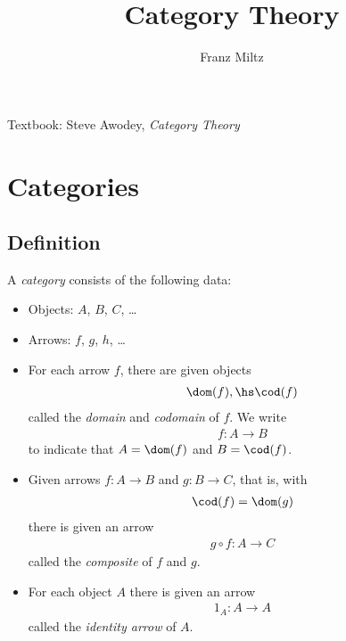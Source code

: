 \documentclass{article}
\begin{document}
\mkawodeythms
\title{Category Theory}
\author{Franz Miltz}
\maketitle
\noindent Textbook: Steve Awodey, \emph{Category Theory}
\tableofcontents
\pagebreak

\section{Categories}

\subsection{Definition}

\begin{definition}
    A \emph{category} consists of the following data:
    \begin{itemize}
        \item Objects: $A$, $B$, $C$, \dots
        \item Arrows: $f$, $g$, $h$, \dots
        \item For each arrow $f$, there are given objects \begin{align*}
                  \dom(f),\hs \cod(f)
              \end{align*}
              called the \emph{domain} and \emph{codomain} of $f$. We write
              \begin{align*}
                  f:A\to B
              \end{align*}
              to indicate that $A=\dom(f)$ and $B=\cod(f)$.
        \item Given arrows $f:A\to B$ and $g:B\to C$, that is, with \begin{align*}
                  \cod(f) = \dom(g)
              \end{align*}
              there is given an arrow
              \begin{align*}
                  g\circ f: A\to C
              \end{align*}
              called the \emph{composite} of $f$ and $g$.
        \item For each object $A$ there is given an arrow \begin{align*}
                  1_A : A\to A
              \end{align*}
              called the \emph{identity arrow} of $A$.
    \end{itemize}

\end{definition}
\end{document}
